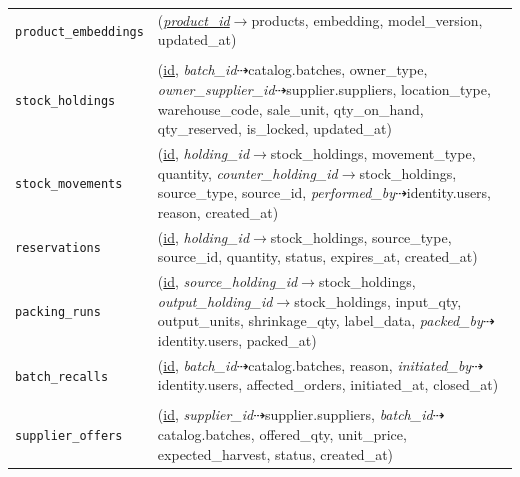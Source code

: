 \begin{longtable}{L{3.10cm} L{11.90cm}}
\texttt{product\_\allowbreak{}embeddings} & (\textit{\underline{product\_\allowbreak{}id}}$\rightarrow$products, embedding, model\_\allowbreak{}version, updated\_\allowbreak{}at) \\
 \\
\texttt{stock\_\allowbreak{}holdings} & (\underline{id}, \textit{batch\_\allowbreak{}id}$\dashrightarrow$catalog.batches, owner\_\allowbreak{}type, \textit{owner\_\allowbreak{}supplier\_\allowbreak{}id}$\dashrightarrow$supplier.suppliers, location\_\allowbreak{}type, warehouse\_\allowbreak{}code, sale\_\allowbreak{}unit, qty\_\allowbreak{}on\_\allowbreak{}hand, qty\_\allowbreak{}reserved, is\_\allowbreak{}locked, updated\_\allowbreak{}at) \\
\texttt{stock\_\allowbreak{}movements} & (\underline{id}, \textit{holding\_\allowbreak{}id}$\rightarrow$stock\_\allowbreak{}holdings, movement\_\allowbreak{}type, quantity, \textit{counter\_\allowbreak{}holding\_\allowbreak{}id}$\rightarrow$stock\_\allowbreak{}holdings, source\_\allowbreak{}type, source\_\allowbreak{}id, \textit{performed\_\allowbreak{}by}$\dashrightarrow$identity.users, reason, created\_\allowbreak{}at) \\
\texttt{reservations} & (\underline{id}, \textit{holding\_\allowbreak{}id}$\rightarrow$stock\_\allowbreak{}holdings, source\_\allowbreak{}type, source\_\allowbreak{}id, quantity, status, expires\_\allowbreak{}at, created\_\allowbreak{}at) \\
\texttt{packing\_\allowbreak{}runs} & (\underline{id}, \textit{source\_\allowbreak{}holding\_\allowbreak{}id}$\rightarrow$stock\_\allowbreak{}holdings, \textit{output\_\allowbreak{}holding\_\allowbreak{}id}$\rightarrow$stock\_\allowbreak{}holdings, input\_\allowbreak{}qty, output\_\allowbreak{}units, shrinkage\_\allowbreak{}qty, label\_\allowbreak{}data, \textit{packed\_\allowbreak{}by}$\dashrightarrow$identity.users, packed\_\allowbreak{}at) \\
\texttt{batch\_\allowbreak{}recalls} & (\underline{id}, \textit{batch\_\allowbreak{}id}$\dashrightarrow$catalog.batches, reason, \textit{initiated\_\allowbreak{}by}$\dashrightarrow$identity.users, affected\_\allowbreak{}orders, initiated\_\allowbreak{}at, closed\_\allowbreak{}at) \\
 \\
\texttt{supplier\_\allowbreak{}offers} & (\underline{id}, \textit{supplier\_\allowbreak{}id}$\dashrightarrow$supplier.suppliers, \textit{batch\_\allowbreak{}id}$\dashrightarrow$catalog.batches, offered\_\allowbreak{}qty, unit\_\allowbreak{}price, expected\_\allowbreak{}harvest, status, created\_\allowbreak{}at) \\

\end{longtable}
